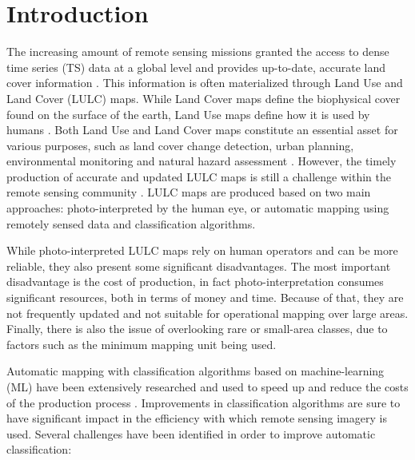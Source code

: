 \documentclass[information,article,submit,moreauthors,pdftex]{Definitions/mdpi}
\begin{document}
\section{Introduction}

The increasing amount of remote sensing missions granted the access to dense
time series (TS) data at a global level and provides up-to-date, accurate land
cover information \citep{Drusch2012}. This information is often materialized
through Land Use and Land Cover (LULC) maps. While Land Cover maps
define the biophysical cover found on the surface of the earth, Land Use maps
define how it is used by humans \citep{Fritz2017}. Both Land Use and Land Cover
maps constitute an essential asset for various purposes, such as land cover
change detection, urban planning, environmental monitoring and natural hazard
assessment \citep{Khatami2016}. However, the timely production of accurate and
updated LULC maps is still a challenge within the remote sensing community
\citep{Wulder2018}. LULC maps are produced based on two main approaches:
photo-interpreted by the human eye, or automatic mapping using remotely sensed
data and classification algorithms.

While photo-interpreted LULC maps rely on human operators and can be more
reliable, they also present some significant disadvantages. The most important
disadvantage is the cost of production, in fact photo-interpretation consumes
significant resources, both in terms of money and time. Because of that, they
are not frequently updated and not suitable for operational mapping over large
areas.  Finally, there is also the issue of overlooking rare or small-area
classes, due to factors such as the minimum mapping unit being used.

Automatic mapping with classification algorithms based on machine-learning
(ML) have been extensively researched and used to speed up and reduce the
costs of the production process \citep{Khatami2016, Gavade2019,
Kaur2019}. Improvements in classification algorithms are sure to have
significant impact in the efficiency with which remote sensing imagery is
used. Several challenges have been identified in order to improve automatic
classification:
\end{document}
